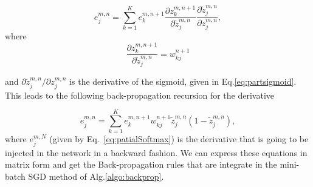 \begin{equation}
e^{m,n}_j = \sum_{k=1}^K e^{m,n+1}_k \frac{\partial z^{m,n+1}_k}{\partial \tilde{z}_{j}^{m,n}}\frac{\partial \tilde{z}^{m,n}_{j}}{\partial z_{j}^{m,n}},
\label{eq:chainRulRecursion}
\end{equation}
%
where %
\begin{equation}
\frac{\partial z^{m,n+1}_k}{\partial \tilde{z}_{j}^{m,n}} = w_{kj}^{n+1} 
\end{equation}

\noindent and ${\partial \tilde{z}^{m,n}_{j}}/{\partial z_{j}^{m,n}}$ is the derivative of the sigmoid, given in Eq.\ref{eq:partsigmoid}. This leads to the following back-propagation recursion for the derivative

\begin{equation}
e^{m,n}_j = \sum_{k=1}^K e^{m,n+1}_k w_{kj}^{n+1}\tilde{z}^{m,n}_{j}(1-\tilde{z}^{m,n}_{j}),
\end{equation}
%
\noindent where $e^{m,N}_j$ (given by Eq.~\ref{eq:patialSoftmax}) is the derivative that is going to be injected in the network in a backward fashion. 
We can express these equations in matrix form 
and get the Back-propagation rules that are integrate in the mini-batch SGD method of Alg.\ref{algo:backprop}. 

